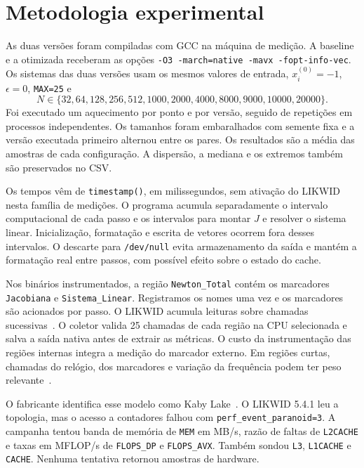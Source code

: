 \documentclass[11pt,a4paper]{article}
\begin{document}
\section{Metodologia experimental}

\AmbienteMedido

As duas versões foram compiladas com GCC na máquina de medição. A baseline e a otimizada receberam as opções \texttt{-O3 -march=native -mavx -fopt-info-vec}. Os sistemas das duas versões usam os mesmos valores de entrada, $x_i^{(0)}=-1$, $\epsilon=0$, \texttt{MAX=25} e
\begin{equation*}
 N\in\{32,64,128,256,512,1000,2000,4000,8000,9000,10000,20000\}.
\end{equation*}
Foi executado um aquecimento por ponto e por versão, seguido de \Repeticoes{} repetições em processos independentes. Os tamanhos foram embaralhados com semente fixa e a versão executada primeiro alternou entre os pares. Os resultados são a média das amostras de cada configuração. A dispersão, a mediana e os extremos também são preservados no CSV.

Os tempos vêm de \texttt{timestamp()}, em milissegundos, sem ativação do LIKWID nesta família de medições. O programa acumula separadamente o intervalo computacional de cada passo e os intervalos para montar $J$ e resolver o sistema linear. Inicialização, formatação e escrita de vetores ocorrem fora desses intervalos. O descarte para \texttt{/dev/null} evita armazenamento da saída e mantém a formatação real entre passos, com possível efeito sobre o estado do cache.

Nos binários instrumentados, a região \texttt{Newton\_Total} contém os marcadores \texttt{Jacobiana} e \texttt{Sistema\_Linear}. Registramos os nomes uma vez e os marcadores são acionados por passo. O LIKWID acumula leituras sobre chamadas sucessivas~\cite{likwid}. O coletor valida 25 chamadas de cada região na CPU selecionada e salva a saída nativa antes de extrair as métricas. O custo da instrumentação das regiões internas integra a medição do marcador externo. Em regiões curtas, chamadas do relógio, dos marcadores e variação da frequência podem ter peso relevante~\cite{pitfalls}.

O fabricante identifica esse modelo como Kaby Lake~\cite{intel}. O LIKWID 5.4.1 leu a topologia, mas o acesso a contadores falhou com \texttt{perf\_event\_paranoid=3}. A campanha tentou banda de memória de \texttt{MEM} em MB/s, razão de faltas de \texttt{L2CACHE} e taxas em MFLOP/s de \texttt{FLOPS\_DP} e \texttt{FLOPS\_AVX}. Também sondou \texttt{L3}, \texttt{L1CACHE} e \texttt{CACHE}. Nenhuma tentativa retornou amostras de hardware.
\end{document}
